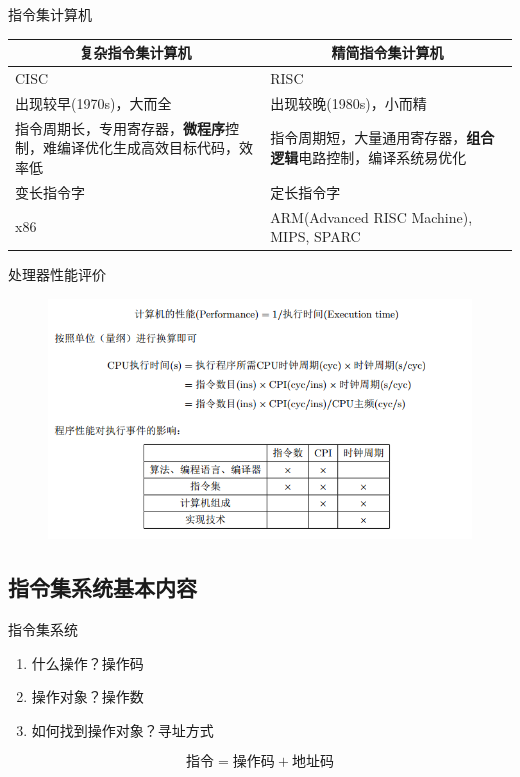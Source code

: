 \documentclass{myslide}
\begin{document}
\begin{frame}[fragile]{指令集计算机}
\begin{center}
\begin{tabular}{|p{5cm}|p{5cm}|}
\hline
\multicolumn{1}{|c|}{\textbf{复杂指令集计算机}} & \multicolumn{1}{c|}{\textbf{精简指令集计算机}}\bigstrut \\\hline\hline
CISC & RISC \bigstrut \\\hline
出现较早(1970s)，大而全 & 出现较晚(1980s)，小而精\bigstrut \\\hline
指令周期长，专用寄存器，\textbf{微程序}控制，难编译优化生成高效目标代码，效率低 & 指令周期短，大量通用寄存器，\textbf{组合逻辑}电路控制，编译系统易优化\bigstrut\\\hline
变长指令字 & 定长指令字\bigstrut \\\hline
x86 & ARM(Advanced RISC Machine), MIPS, SPARC\bigstrut \\\hline
\end{tabular}
\end{center}
\end{frame}

\begin{frame}{处理器性能评价}
\begin{figure}
\centering
\includegraphics[width=\linewidth]{fig/Lecture2/processor_performance-2.PNG}
\end{figure}
\end{frame}

\subsection{指令集系统基本内容}
\begin{frame}
\subsectionpage
\end{frame}

\begin{frame}{指令集系统}
\begin{enumerate}
	\item 什么操作？\pause 操作码\pause
	\item 操作对象？\pause 操作数\pause
	\item 如何找到操作对象？\pause 寻址方式 %
\end{enumerate}
\[
\text{指令}=\text{操作码}+\text{地址码}
\]
\end{frame}
\end{document}
